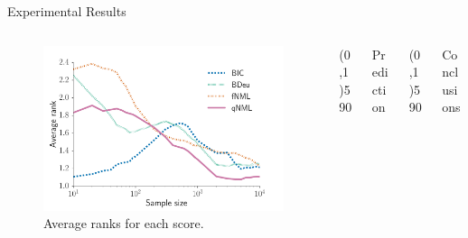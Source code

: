 \documentclass[final]{beamer}
\newcommand{\heading}[1]{\alert{\large #1}\\}
\theoremstyle{plain}
\begin{document}
\begin{frame}{}
\begin{block}{Experimental Results}
\begin{columns}[T]
\begin{column}{0.35\textwidth}
\begin{minipage}{0.45\textwidth}
\begin{itemize}
	  \end{itemize}
	  \begin{figure}[h]
		\includegraphics[width=\columnwidth]{shd_rank_all.pdf}
		\caption{Average ranks for each score.}
		\label{fig:all_shd}
		\end{figure}
	  \end{minipage}
	  
	\vspace*{12pt}
    \end{column}
   \begin{column}{0.005\textwidth}\linethickness{0.3ex}
      \color{myPurple} \line(0,1){590}
   \end{column} %
   
    \begin{column}{0.23\textwidth}
    \heading{Prediction}
      
    \end{column}
    
    \begin{column}{0.005\textwidth}\linethickness{0.3ex} %
      \color{myPurple} \line(0,1){590}
   \end{column} %
    \begin{column}{0.3\textwidth}
    \heading{Conclusions}

    \end{column}
  \end{columns}
\end{block}


\end{frame}
\end{document}
